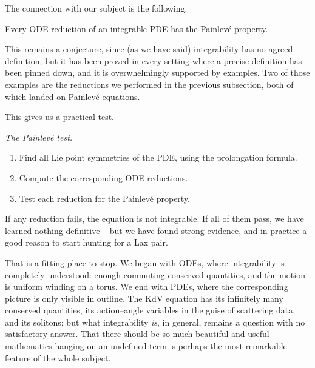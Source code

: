 \documentclass[a4paper]{scrartcl}
\begin{document}
The connection with our subject is the following.

\begin{conjecture}
	Every ODE reduction of an integrable PDE has the Painlev\'e property.
\end{conjecture}

This remains a conjecture, since (as we have said) integrability has no agreed definition; but it has been proved in every setting where a precise definition has been pinned down, and it is overwhelmingly supported by examples. Two of those examples are the reductions we performed in the previous subsection, both of which landed on Painlev\'e equations.

This gives us a practical test.

\begin{center}
	\emph{The Painlev\'e test.}
\end{center}
\begin{enumerate}[label=(\arabic*)]
	\item Find all Lie point symmetries of the PDE, using the prolongation formula.
	\item Compute the corresponding ODE reductions.
	\item Test each reduction for the Painlev\'e property.
\end{enumerate}
If any reduction fails, the equation is not integrable. If all of them pass, we have learned nothing definitive -- but we have found strong evidence, and in practice a good reason to start hunting for a Lax pair.

That is a fitting place to stop. We began with ODEs, where integrability is completely understood: enough commuting conserved quantities, and the motion is uniform winding on a torus. We end with PDEs, where the corresponding picture is only visible in outline. The KdV equation has its infinitely many conserved quantities, its action--angle variables in the guise of scattering data, and its solitons; but what integrability \emph{is}, in general, remains a question with no satisfactory answer. That there should be so much beautiful and useful mathematics hanging on an undefined term is perhaps the most remarkable feature of the whole subject.
\end{document}
